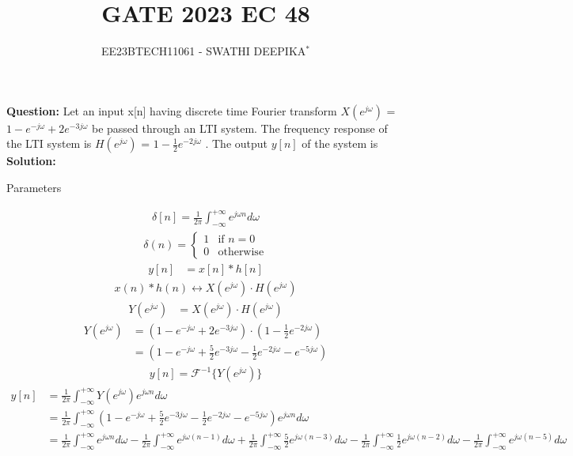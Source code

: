\documentclass[journal,12pt,twocolumn]{IEEEtran}
\title{
	
\title{GATE 2023 EC 48}
\author{EE23BTECH11061 - SWATHI DEEPIKA$^{*}$%
}


}
\theoremstyle{remark}
\newcommand{\solution}{\noindent \textbf{Solution: }}
\begin{document}
\maketitle

\textbf{Question:} 
Let an input x[n] having discrete time Fourier transform
 $X(e^{j\omega})$  = $1 - e^{-j\omega} + 2e^{-3j\omega}$  be passed through an LTI system. The frequency response of the LTI system is  $H(e^{j\omega})$ = $1 - \frac{1}{2} e^{-2j\omega}$ . The output $y[n]$ of the system is \\  
\solution

 \begin{table}[h]
 	\centering
 	\resizebox{6 cm}{!}{
 		
 	}
 	\vspace{6 pt}
 	\caption{Parameters}
 	\label{tab:swag_tabel} 
 \end{table}
 
 \begin{align}
 \delta[n]=\frac{1}{2\pi}\int_{-\infty}^{+\infty} e^{j\omega n} d\omega
 \end{align}
\begin{align}
\delta(n) = \begin{cases} 1 & \text{if } n = 0 \\ 0 & \text{otherwise} \end{cases}
\end{align}
\begin{align}
y[n] &= x[n] * h[n]
\end{align}
\begin{align*}
x(n) * h(n) \longleftrightarrow X(e^{j\omega}) \cdot H(e^{j\omega})
\end{align*}
\begin{align}
Y(e^{j\omega}) &= X(e^{j\omega}) \cdot H(e^{j\omega})
\end{align}
\begin{align}
Y(e^{j\omega}) &= (1 - e^{-j\omega} + 2e^{-3j\omega}) \cdot \left(1 - \frac{1}{2}e^{-2j\omega}\right) \\
&= (1 - e^{-j\omega} + \frac{5}{2}e^{-3j\omega} - \frac{1}{2}e^{-2j\omega} - e^{-5j\omega})
\end{align}
\begin{align*}
y[n] = \mathcal{F}^{-1}\{ Y(e^{j\omega}) \}
\end{align*}
\begin{align}
y[n] &= \frac{1}{2\pi}\int_{-\infty}^{+\infty}  Y(e^{j\omega})e^{j\omega n} d\omega \\
&= \frac{1}{2\pi}\int_{-\infty}^{+\infty}  \left(1 - e^{-j\omega} + \frac{5}{2}e^{-3j\omega} - \frac{1}{2}e^{-2j\omega} - e^{-5j\omega}\right)e^{j\omega n} d\omega \\
&= \frac{1}{2\pi}\int_{-\infty}^{+\infty} e^{j\omega n} d\omega - \frac{1}{2\pi}\int_{-\infty}^{+\infty} e^{j\omega(n-1)} d\omega +\frac{1}{2\pi}\int_{-\infty}^{+\infty} \frac{5}{2}e^{j\omega (n-3)} d\omega 
- \frac{1}{2\pi}\int_{-\infty}^{+\infty} \frac{1}{2}e^{j\omega (n-2)} d\omega - \frac{1}{2\pi}\int_{-\infty}^{+\infty} e^{j\omega (n-5)} d\omega 
\end{align}
\end{document}
